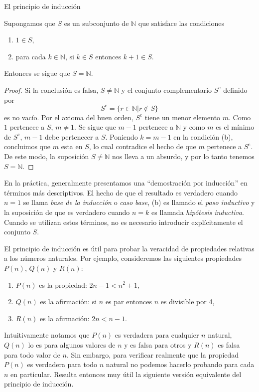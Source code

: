 \begin{section}{El principio de inducción}
\begin{teorema}\label{t1.4} Supongamos que $S$ es un subconjunto de $\mathbb N$ que satisface las condiciones 
\begin{enumerate}
\item $1 \in S$,
\item para cada $k \in \mathbb N$, si $ k \in S$ entonces $k+1\in S$.
\end{enumerate}
Entonces se sigue que $S=\mathbb N$.
\end{teorema}
\begin{proof}Si la conclusión es falsa, $S \not= \mathbb N$ y
el conjunto complementario $S^{\text{c}}$ definido por
$$
S^{\text{c}}= \{ r \in \mathbb N | r\not\in S\}
$$
 es no vacío. Por el axioma del buen orden, $S^{\text{c}}$ tiene un menor elemento $m$. Como $1$ pertenece a $S$, $m\not=1$. Se sigue que $m-1$ pertenece a $\mathbb N$ y como $m$ es el mínimo de $S^{\text{c}}$, $m-1$ debe pertenecer a $S$. Poniendo $k=m-1$ en la condición (b), concluimos que $m$ esta en $S$, lo cual contradice el hecho de que $m$ pertenece a $S^{\text{c}}$. De este modo, la suposición $S \not= \mathbb N$ nos lleva a un absurdo, y por lo tanto tenemos $S= \mathbb N$. 
 \end{proof}

En la práctica, generalmente presentamos una ``demostración por inducción'' en términos más descriptivos. El hecho de que el resultado es verdadero cuando $n=1$ se llama \textit{base de la inducción} o \textit{caso base}, (b) es llamado  el {\em paso inductivo} y la suposición de que es verdadero cuando $n=k$ es llamada \textit{hipótesis inductiva}. Cuando se utilizan estos términos, no es necesario introducir explícitamente el conjunto $S$.


El principio de inducción es útil para probar la veracidad de propiedades relativas a los números naturales. Por ejemplo, consideremos las siguientes propiedades $P(n)$, $Q(n)$ y $R(n)$:
\begin{enumerate}[label=\textit{\alph*)}]
\item $P(n)$ es la propiedad: $2n -1 < n^2 + 1$,
\item $Q(n)$ es la afirmación: si $n$ es par entonces $n$ es divisible por 4,
\item $R(n)$ es la afirmación: $2n < n- 1$.
\end{enumerate}
Intuitivamente notamos que $P(n)$ es verdadera para cualquier $n$ natural, $Q(n)$ lo es para algunos valores de $n$ y es falsa para otros y $R(n)$ es falsa para todo valor de $n$. Sin embargo, para verificar realmente que la propiedad $P(n)$ es verdadera para todo $n$ natural no podemos hacerlo probando para cada $n$ en particular. Resulta entonces muy útil la siguiente versión equivalente del principio de inducción.


\end{section}
